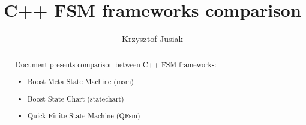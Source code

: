 \documentclass[12pt]{report}
\begin{document}
\author{Krzysztof Jusiak}
\title{C++ FSM frameworks comparison}
\frenchspacing
\maketitle

\begin{abstract}
Document presents comparison between C++ FSM frameworks:
\begin{itemize}
\item Boost Meta State Machine (msm)
\item Boost State Chart (statechart)
\item Quick Finite State Machine (QFsm)
\end{itemize}
\end{abstract}

\clearpage
\tableofcontents

\clearpage
\listoffigures
\listoftables
\end{document}
